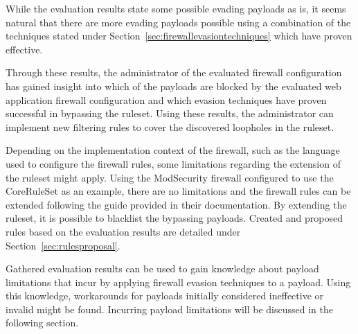 While the evaluation results state some possible evading payloads as is, it seems natural that there are more evading payloads possible using a combination of the techniques stated under Section~\ref{sec:firewallevasiontechniques} which have proven effective.

Through these results, the administrator of the evaluated firewall configuration has gained insight into which of the payloads are blocked by the evaluated web application firewall configuration and which evasion techniques have proven successful in bypassing the ruleset. Using these results, the administrator can implement new filtering rules to cover the discovered loopholes in the ruleset.

Depending on the implementation context of the firewall, such as the language used to configure the firewall rules, some limitations regarding the extension of the ruleset might apply. Using the ModSecurity firewall configured to use the CoreRuleSet as an example, there are no limitations and the firewall rules can be extended following the guide provided in their documentation. By extending the ruleset, it is possible to blacklist the bypassing payloads. Created and proposed rules based on the evaluation results are detailed under Section~\ref{sec:rulesproposal}.

Gathered evaluation results can be used to gain knowledge about payload limitations that incur by applying firewall evasion techniques to a payload. Using this knowledge, workarounds for payloads initially considered ineffective or invalid might be found. Incurring payload limitations will be discussed in the following section.
